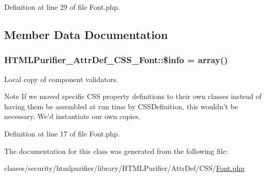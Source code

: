 Definition at line 29 of file Font.\+php.



\subsection{Member Data Documentation}
\hypertarget{classHTMLPurifier__AttrDef__CSS__Font_a18be00fdfbebb2803a53d1590569f05e}{
\subsubsection[{\$info}]{\setlength{\rightskip}{0pt plus 5cm}H\+T\+M\+L\+Purifier\+\_\+\+Attr\+Def\+\_\+\+C\+S\+S\+\_\+\+Font\+::\$info = array()\hspace{0.3cm}{\ttfamily [protected]}}}\label{classHTMLPurifier__AttrDef__CSS__Font_a18be00fdfbebb2803a53d1590569f05e}
Local copy of component validators.

\begin{DoxyNote}{Note}
If we moved specific C\+S\+S property definitions to their own classes instead of having them be assembled at run time by C\+S\+S\+Definition, this wouldn't be necessary. We'd instantiate our own copies. 
\end{DoxyNote}


Definition at line 17 of file Font.\+php.



The documentation for this class was generated from the following file\+:\begin{DoxyCompactItemize}
\item 
classes/security/htmlpurifier/library/\+H\+T\+M\+L\+Purifier/\+Attr\+Def/\+C\+S\+S/\hyperlink{AttrDef_2CSS_2Font_8php}{Font.\+php}\end{DoxyCompactItemize}
